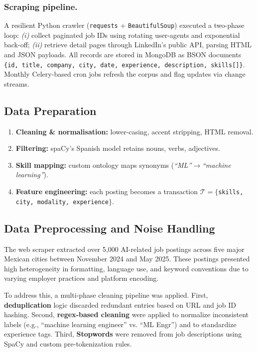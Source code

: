 \documentclass{svproc} %
\begin{document}
	
	\subsubsection{Scraping pipeline.}
	A resilient Python crawler (\texttt{requests} + \texttt{BeautifulSoup}) executed a two-phase loop:  
	\emph{(i)} collect paginated job IDs using rotating user-agents and exponential back-off;  
	\emph{(ii)} retrieve detail pages through LinkedIn’s public API, parsing HTML and JSON payloads.  
	All records are stored in MongoDB as BSON documents\\
	\verb|{id, title, company, city, date, experience, description, skills[]}|.  
	Monthly Celery-based cron jobs refresh the corpus and flag updates via change streams.
	
	\subsection{Data Preparation}
	\label{ssec:data_prep}
	
	\begin{enumerate}
		\item \textbf{Cleaning \& normalisation:} lower-casing, accent stripping, HTML removal.
		\item \textbf{Filtering:} spaCy’s Spanish model retains nouns, verbs, adjectives.
		\item \textbf{Skill mapping:} custom ontology maps synonyms (\textit{“ML”}$\rightarrow$\textit{“machine learning”}).
		\item \textbf{Feature engineering:} each posting becomes a transaction
		$\mathcal{T}=\{$\texttt{skills, city, modality, experience}$\}$.
	\end{enumerate}
	
	\subsection{Data Preprocessing and Noise Handling}
	
	The web scraper extracted over 5,000 AI-related job postings across five major Mexican cities between November 2024 and May 2025. These postings presented high heterogeneity in formatting, language use, and keyword conventions due to varying employer practices and platform encoding.
	
	To address this, a multi-phase cleaning pipeline was applied. First, \textbf{deduplication} logic discarded redundant entries based on URL and job ID hashing. Second, \textbf{regex-based cleaning} were applied to normalize inconsistent labels (e.g., ``machine learning engineer'' vs. ``ML Engr'') and to standardize experience tags. Third, \textbf{Stopwords} were removed from job descriptions using SpaCy and custom pre-tokenization rules.
	
\end{document}
